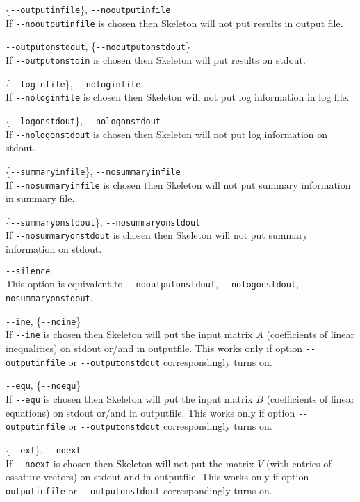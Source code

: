 \documentclass{article}
\newcommand{\Skeleton}{{\sc Skeleton}\xspace}
\newcommand{\params}{\smallskip\hangindent=2\parindent}
\begin{document}
\params \{\verb$--outputinfile$\}, \verb$--nooutputinfile$ \\
  If \verb$--nooutputinfile$ is chosen then \Skeleton will not put results in output file. 

\params \verb$--outputonstdout$, \{\verb$--nooutputonstdout$\} \\
  If \verb$--outputonstdin$ is chosen then \Skeleton will put results on stdout. 

\params \{\verb$--loginfile$\}, \verb$--nologinfile$ \\
  If \verb$--nologinfile$ is chosen then \Skeleton will not put log information in log file. 

\params \{\verb$--logonstdout$\}, \verb$--nologonstdout$ \\
  If \verb$--nologonstdout$ is chosen then \Skeleton will not put 
  log information on stdout. 

\params \{\verb$--summaryinfile$\}, \verb$--nosummaryinfile$ \\
  If \verb$--nosummaryinfile$ is chosen then \Skeleton will not put 
  summary information in summary file. 

\params \{\verb$--summaryonstdout$\}, \verb$--nosummaryonstdout$ \\
  If \verb$--nosummaryonstdout$ is chosen then \Skeleton will not put 
  summary information on stdout. 
  
\params \verb$--silence$ \\
  This option is equivalent to \verb$--nooutputonstdout$, \verb$--nologonstdout$, \verb$--nosummaryonstdout$.

\params \verb$--ine$, \{\verb$--noine$\} \\
  If \verb$--ine$ is chosen then \Skeleton will put 
  the input matrix $A$ (coefficients of linear inequalities) on stdout or/and in outputfile. 
  This works only if option 
  \verb$--outputinfile$ or \verb$--outputonstdout$ correspondingly turns on.

\params \verb$--equ$, \{\verb$--noequ$\} \\
  If \verb$--equ$ is chosen then \Skeleton will put 
  the input matrix $B$ (coefficients of linear equations) on stdout or/and in outputfile. 
  This works only if option 
  \verb$--outputinfile$ or \verb$--outputonstdout$ correspondingly turns on.

\params \{\verb$--ext$\}, \verb$--noext$ \\ 
  If \verb$--noext$ is chosen then \Skeleton will not put 
  the matrix $V$ (with entries of ossature vectors) on stdout and in outputfile. 
  This works only if option 
  \verb$--outputinfile$ or \verb$--outputonstdout$ correspondingly turns on.
\end{document}
